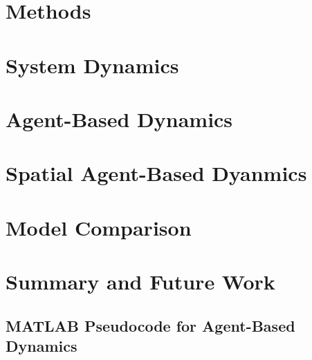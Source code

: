 \documentclass[10pt]{article}
\begin{document}
\section{Methods}






\section{System Dynamics}



\section{Agent-Based Dynamics}



\section{Spatial Agent-Based Dyanmics}
%


\section{Model Comparison}



\section{Summary and Future Work}



\begin{appendices}
\section{MATLAB Pseudocode for Agent-Based Dynamics}


\end{appendices}
\end{document}
